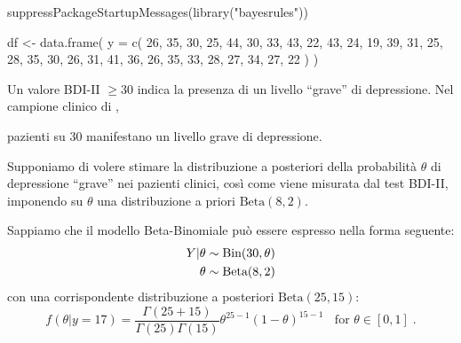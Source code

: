 \documentclass[
  11pt,
  italian,
  a4paper,
  extrafontsizes,onecolumn,openright
  ]{memoir}
\newenvironment{Shaded}{\begin{snugshade}}{\end{snugshade}}
\newcommand{\AttributeTok}[1]{\textcolor[rgb]{0.77,0.63,0.00}{#1}}
\newcommand{\CommentTok}[1]{\textcolor[rgb]{0.56,0.35,0.01}{\textit{#1}}}
\newcommand{\DecValTok}[1]{\textcolor[rgb]{0.00,0.00,0.81}{#1}}
\newcommand{\FunctionTok}[1]{\textcolor[rgb]{0.00,0.00,0.00}{#1}}
\newcommand{\NormalTok}[1]{#1}
\newcommand{\OtherTok}[1]{\textcolor[rgb]{0.56,0.35,0.01}{#1}}
\newcommand{\SpecialCharTok}[1]{\textcolor[rgb]{0.00,0.00,0.00}{#1}}
\newcommand{\StringTok}[1]{\textcolor[rgb]{0.31,0.60,0.02}{#1}}
\begin{document}
\begin{Shaded}
\begin{Highlighting}[]
\FunctionTok{suppressPackageStartupMessages}\NormalTok{(}\FunctionTok{library}\NormalTok{(}\StringTok{"bayesrules"}\NormalTok{))}

\NormalTok{df }\OtherTok{\textless{}{-}} \FunctionTok{data.frame}\NormalTok{(}
  \AttributeTok{y =} \FunctionTok{c}\NormalTok{(}
    \DecValTok{26}\NormalTok{, }\DecValTok{35}\NormalTok{, }\DecValTok{30}\NormalTok{, }\DecValTok{25}\NormalTok{, }\DecValTok{44}\NormalTok{, }\DecValTok{30}\NormalTok{, }\DecValTok{33}\NormalTok{, }\DecValTok{43}\NormalTok{, }\DecValTok{22}\NormalTok{, }\DecValTok{43}\NormalTok{,}
    \DecValTok{24}\NormalTok{, }\DecValTok{19}\NormalTok{, }\DecValTok{39}\NormalTok{, }\DecValTok{31}\NormalTok{, }\DecValTok{25}\NormalTok{, }\DecValTok{28}\NormalTok{, }\DecValTok{35}\NormalTok{, }\DecValTok{30}\NormalTok{, }\DecValTok{26}\NormalTok{, }\DecValTok{31}\NormalTok{,}
    \DecValTok{41}\NormalTok{, }\DecValTok{36}\NormalTok{, }\DecValTok{26}\NormalTok{, }\DecValTok{35}\NormalTok{, }\DecValTok{33}\NormalTok{, }\DecValTok{28}\NormalTok{, }\DecValTok{27}\NormalTok{, }\DecValTok{34}\NormalTok{, }\DecValTok{27}\NormalTok{, }\DecValTok{22}
\NormalTok{  )}
\NormalTok{)}
\end{Highlighting}
\end{Shaded}

Un valore BDI-II \(\geq 30\) indica la presenza di un livello ``grave'' di depressione. Nel campione clinico di \textcite{zetschefuture2019},

\begin{Shaded}
\end{Shaded}

 pazienti su 30 manifestano un livello grave di depressione.

Supponiamo di volere stimare la distribuzione a posteriori della probabilità \(\theta\) di depressione ``grave'' nei pazienti clinici, così come viene misurata dal test BDI-II, imponendo su \(\theta\) una distribuzione a priori \(\mbox{Beta}(8, 2)\).

Sappiamo che il modello Beta-Binomiale può essere espresso nella forma seguente:
\begin{align}
Y | \theta & \sim \mbox{Bin}(30, \theta) \notag\\
\theta & \sim \mbox{Beta}(8, 2) \notag
\end{align}
con una corrispondente distribuzione a posteriori \(\mbox{Beta}(25, 15)\):
\begin{equation}
f(\theta | y = 17) = \frac{\Gamma(25 + 15)}{\Gamma(25)\Gamma(15)}\theta^{25-1} (1-\theta)^{15-1} \;\; \text{ for } \theta \in [0,1] \; .
\label{eq:post-beta-25-15}
\end{equation}
\end{document}
